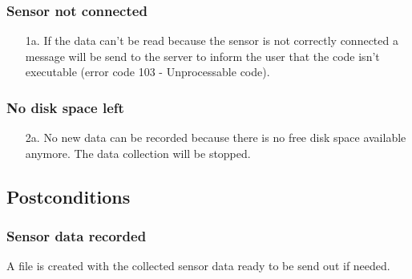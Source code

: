 \documentclass[notitlepage]{article}
\begin{document}
\subsubsection*{Sensor not connected}
\begin{enumerate}
	\item[1a.]{If the data can't be read because the sensor is not correctly connected a message will be send to the server to inform the user that the code isn't executable (error code 103 - Unprocessable code).}
\end{enumerate}

\subsubsection*{No disk space left}
\begin{enumerate}
	\item[2a.]{No new data can be recorded because there is no free disk space available anymore. The data collection will be stopped.}
\end{enumerate}

\subsection{Postconditions}

\subsubsection{Sensor data recorded}
A file is created with the collected sensor data ready to be send out if needed.
\end{document}
